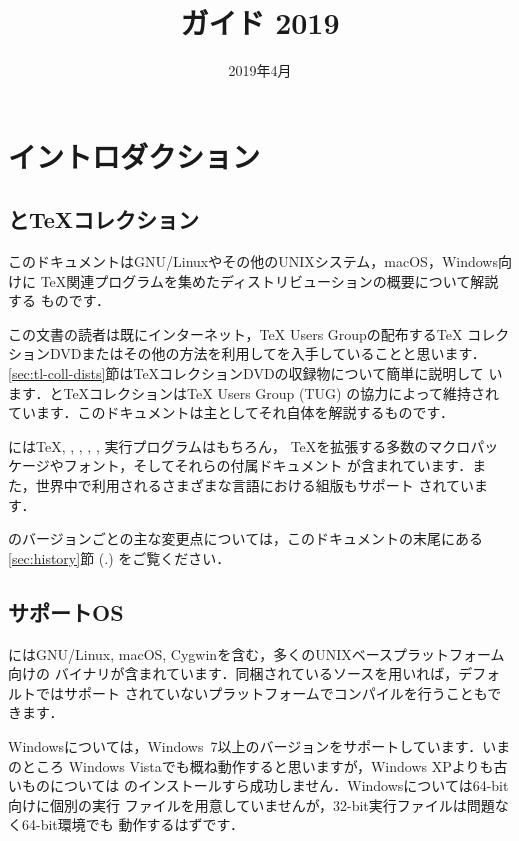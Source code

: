 \documentclass[uplatex,dvipdfmx,tombow]{jsarticle}
\title{\TL ガイド 2019}
\date{2019年4月}
\begin{document}
\maketitle
\thispagestyle{empty}

\tableofcontents

\section{イントロダクション}\label{sec:intro}

\subsection{\TL と\TeX コレクション}

このドキュメントはGNU/Linuxやその他のUNIXシステム，macOS，Windows向けに
\TeX 関連プログラムを集めたディストリビューション\TL の概要について解説する
ものです．

この文書の読者は既にインターネット，{\TeX} Users Groupの配布する\TeX
コレクションDVDまたはその他の方法を利用して\TL を入手していることと思います．
\ref{sec:tl-coll-dists}節は\TeX コレクションDVDの収録物について簡単に説明して
います．\TL と\TeX コレクションは{\TeX} Users Group (TUG) の協力によって維持され
ています．このドキュメントは主として\TL それ自体を解説するものです．

\TL には\TeX, \LaTeXe, \ConTeXt, \MF, \MP, \BibTeX 実行プログラムはもちろん，
\TeX を拡張する多数のマクロパッケージやフォント，そしてそれらの付属ドキュメント
が含まれています．また，世界中で利用されるさまざまな言語における組版もサポート
されています．

\TL のバージョンごとの主な変更点については，このドキュメントの末尾にある
\ref{sec:history}節 (\p.\pageref{sec:history}) をご覧ください．

\subsection{サポートOS}
\label{sec:os-support}

\TL にはGNU/Linux, macOS, Cygwinを含む，多くのUNIXベースプラットフォーム向けの
バイナリが含まれています．同梱されているソースを用いれば，デフォルトではサポート
されていないプラットフォームでコンパイルを行うこともできます．

Windowsについては，Windows~7以上のバージョンをサポートしています．いまのところ
Windows Vistaでも概ね動作すると思いますが，Windows XPよりも古いものについては
\TL のインストールすら成功しません．Windowsについては64-bit向けに個別の実行
ファイルを用意していませんが，32-bit実行ファイルは問題なく64-bit環境でも
動作するはずです．
\end{document}
